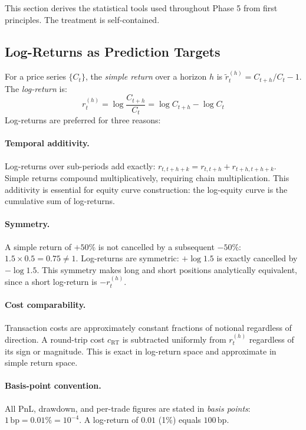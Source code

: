 \documentclass[12pt, a4paper]{article}
\theoremstyle{plain}
\theoremstyle{definition}
\newcommand{\bp}{\,\mathrm{bp}}
\begin{document}
This section derives the statistical tools used throughout Phase 5 from
first principles.  The treatment is self-contained.

\subsection{Log-Returns as Prediction Targets}

For a price series $\{C_t\}$, the \emph{simple return} over a horizon $h$ is
$\tilde{r}_t^{(h)} = C_{t+h}/C_t - 1$.  The \emph{log-return} is:
\[
  r_t^{(h)} = \log\frac{C_{t+h}}{C_t} = \log C_{t+h} - \log C_t
\]
Log-returns are preferred for three reasons:

\paragraph{Temporal additivity.}
Log-returns over sub-periods add exactly: $r_{t,t+h+k} = r_{t,t+h} + r_{t+h,t+h+k}$.
Simple returns compound multiplicatively, requiring chain multiplication.
This additivity is essential for equity curve construction: the log-equity
curve is the cumulative sum of log-returns.

\paragraph{Symmetry.}
A simple return of $+50\%$ is not cancelled by a subsequent $-50\%$:
$1.5 \times 0.5 = 0.75 \neq 1$.  Log-returns are symmetric: $+\log 1.5$
is exactly cancelled by $-\log 1.5$.  This symmetry makes long and short
positions analytically equivalent, since a short log-return is $-r_t^{(h)}$.

\paragraph{Cost comparability.}
Transaction costs are approximately constant fractions of notional regardless
of direction.  A round-trip cost $c_{\text{RT}}$ is subtracted uniformly from
$r_t^{(h)}$ regardless of its sign or magnitude.  This is exact in log-return
space and approximate in simple return space.

\paragraph{Basis-point convention.}
All PnL, drawdown, and per-trade figures are stated in \emph{basis points}:
$1\bp = 0.01\% = 10^{-4}$.  A log-return of $0.01$ (1\%) equals $100\bp$.
\end{document}
